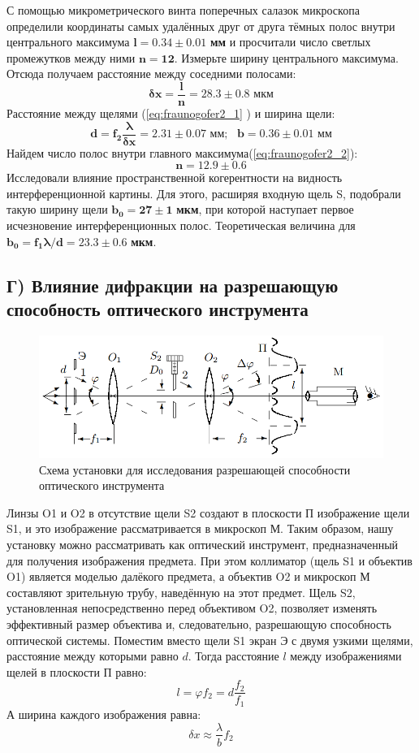 С помощью микрометрического винта поперечных салазок микроскопа определили координаты самых удалённых друг от друга тёмных полос
внутри центрального максимума $\mathbf{l = 0.34 \pm 0.01}$ \textbf{мм} и просчитали число светлых промежутков между ними $\mathbf{n = 12}$. Измерьте ширину центрального максимума. Отсюда получаем расстояние между соседними полосами:
$$
\mathbf{\delta x = \frac{l}{n} = 28.3 \pm 0.8} \textbf{ мкм}
$$
Расстояние между щелями (\ref{eq:fraunogofer2_1} ) и ширина щели:
$$
\mathbf{d = f_2\frac{\lambda}{\delta x} = 2.31 \pm 0.07}\textbf{ мм};\text{  } 
\mathbf{b = 0.36\pm 0.01}\textbf{ мм}
$$
Найдем число полос внутри главного максимума(\ref{eq:fraunogofer2_2}):
$$
\mathbf{n = 12.9 \pm 0.6}
$$
\indent
Исследовали влияние пространственной когерентности на видность интерференционной картины. Для этого, расширяя входную щель S, подобрали такую ширину щели $\mathbf{b_0 = 27 \pm 1}$ \textbf{ мкм}, при которой наступает первое исчезновение интерференционных полос. Теоретическая величина для $\mathbf{b_0 = f_1\lambda/d = 23.3\pm0.6}$ \textbf{ мкм}.

\subsection*{Г) Влияние дифракции на разрешающую способность оптического инструмента}

\begin{figure}[h!]
    \centering
    \includegraphics[width=12cm]{images/setup4.png}
    \caption{Схема установки для исследования разрешающей способности оптического инструмента}
\end{figure}
\indent
Линзы O1 и O2 в отсутствие щели S2 создают в плоскости П изображение щели S1, и это изображение рассматривается в микроскоп М. Таким образом, нашу установку можно рассматривать как оптический инструмент, предназначенный для получения
изображения предмета. При этом коллиматор (щель S1 и объектив O1)
является моделью далёкого предмета, а объектив O2 и микроскоп М
составляют зрительную трубу, наведённую на этот предмет.
Щель S2, установленная непосредственно перед объективом O2, позволяет изменять эффективный размер объектива и, следовательно, разрешающую способность оптической системы.
\indent
Поместим вместо щели S1 экран Э с двумя узкими щелями, расстояние между которыми равно $d$. Тогда расстояние $l$ между
изображениями щелей в плоскости П равно:
\begin{equation}
    l = \varphi f_2 = d\frac{f_2}{f_1}
\end{equation}
А ширина каждого изображения равна:
\begin{equation}
    \delta x \approx \frac{\lambda}{b}f_2
\end{equation}


